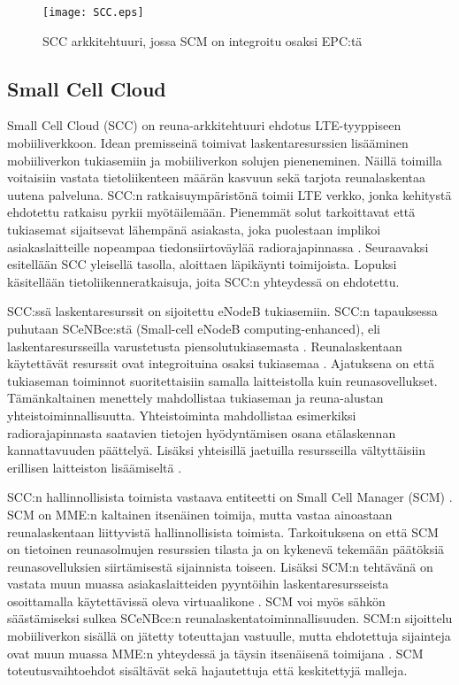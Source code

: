 \begin{figure}[tb]
\texttt{[image: SCC.eps]}
\caption{SCC arkkitehtuuri, jossa SCM on integroitu osaksi EPC:tä \cite{lobillo15scc} } \label{fig:scc}
\end{figure}

\subsection{Small Cell Cloud} \label{scc}

Small Cell Cloud (SCC) on reuna-arkkitehtuuri ehdotus LTE-tyyppiseen mobiiliverkkoon.
Idean premisseinä toimivat laskentaresurssien lisääminen mobiiliverkon tukiasemiin ja mobiiliverkon solujen pieneneminen.
Näillä toimilla voitaisiin vastata tietoliikenteen määrän kasvuun sekä tarjota reunalaskentaa uutena palveluna.
SCC:n ratkaisuympäristönä toimii LTE verkko, jonka kehitystä ehdotettu ratkaisu pyrkii myötäilemään.
Pienemmät solut tarkoittavat että tukiasemat sijaitsevat lähempänä asiakasta, joka puolestaan implikoi asiakaslaitteille nopeampaa tiedonsiirtoväylää radiorajapinnassa \cite{lobillo15scc}.
Seuraavaksi esitellään SCC yleisellä tasolla, aloittaen läpikäynti toimijoista. Lopuksi käsitellään tietoliikenneratkaisuja, joita SCC:n yhteydessä on ehdotettu.

SCC:ssä laskentaresurssit on sijoitettu eNodeB tukiasemiin. SCC:n tapauksessa puhutaan SCeNBce:stä (Small-cell eNodeB computing-enhanced), eli laskentaresursseilla varustetusta piensolutukiasemasta \cite{lobillo15scc}.
Reunalaskentaan käytettävät resurssit ovat integroituina osaksi tukiasemaa \cite{puente15seamless}.
Ajatuksena on että tukiaseman toiminnot suoritettaisiin samalla laitteistolla kuin reunasovellukset.
Tämänkaltainen menettely mahdollistaa tukiaseman ja reuna-alustan yhteistoiminnallisuutta.
Yhteistoiminta mahdollistaa esimerkiksi radiorajapinnasta saatavien tietojen hyödyntämisen osana etälaskennan kannattavuuden päättelyä.
Lisäksi yhteisillä jaetuilla resursseilla vältyttäisiin erillisen laitteiston lisäämiseltä \cite{puente15seamless}.

SCC:n hallinnollisista toimista vastaava entiteetti on Small Cell Manager (SCM) \cite{lobillo15scc}.
SCM on MME:n kaltainen itsenäinen toimija, mutta vastaa ainoastaan reunalaskentaan liittyvistä hallinnollisista toimista.
Tarkoituksena on että SCM on tietoinen reunasolmujen resurssien tilasta ja on kykenevä tekemään päätöksiä reunasovelluksien siirtämisestä sijainnista toiseen. 
Lisäksi SCM:n tehtävänä on vastata muun muassa asiakaslaitteiden pyyntöihin laskentaresursseista osoittamalla käytettävissä oleva virtuaalikone \cite{dolezal2016performance}.
SCM voi myös sähkön säästämiseksi sulkea SCeNBce:n reunalaskentatoiminnallisuuden.
SCM:n sijoittelu mobiiliverkon sisällä on jätetty toteuttajan vastuulle, mutta ehdotettuja sijainteja ovat muun muassa MME:n yhteydessä ja täysin itsenäisenä toimijana \cite{lobillo15scc}.
SCM toteutusvaihtoehdot sisältävät sekä hajautettuja että keskitettyjä malleja.

